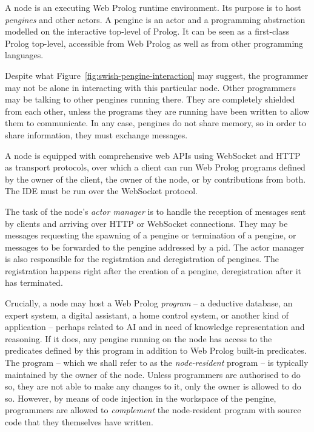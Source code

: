 \documentclass{tlp}
\begin{document}
A node is an executing Web Prolog runtime environment. Its purpose is to host \textit{pengines} and other actors. A pengine is an actor and a programming abstraction modelled on the interactive top-level of Prolog. It can be seen as a first-class Prolog top-level, accessible from Web Prolog as well as from other programming languages. 



Despite what Figure~\ref{fig:swish-pengine-interaction} may suggest, the programmer may not be alone in interacting with this particular node. Other programmers may be talking to other pengines running there. They are completely shielded from each other, unless the programs they are running have been written to allow them to communicate. In any case, pengines do not share memory, so in order to share information, they must exchange messages.

A node is equipped with comprehensive web APIs using WebSocket and HTTP as transport protocols, over which a client can run Web Prolog programs defined by the owner of the client, the owner of the node, or by contributions from both. The IDE must be run over the WebSocket protocol.

The task of the node's \textit{actor manager} is to handle the reception of messages sent by clients and arriving over HTTP or WebSocket connections. They may be messages requesting the spawning of a pengine or termination of a pengine, or messages to be forwarded to the pengine addressed by a pid. The actor manager is also responsible for the registration and deregistration of pengines. The registration happens right after the creation of a pengine, deregistration after it has terminated.

Crucially, a node may host a Web Prolog \textit{program} -- a deductive database, an expert system, a digital assistant, a home control system, or another kind of application -- perhaps related to AI and in need of knowledge representation and reasoning. If it does, any pengine running on the node has access to the predicates defined by this program in addition to Web Prolog built-in predicates. The program -- which we shall refer to as the \textit{node-resident} program -- is typically maintained by the owner of the node. Unless programmers are authorised to do so, they are not able to make any changes to it, only the owner is allowed to do so. However, by means of code injection in the workspace of the pengine, programmers are allowed to \textit{complement} the node-resident program with source code that they themselves have written. 
\end{document}
